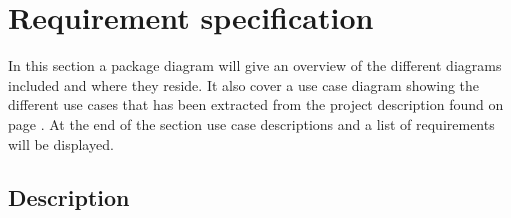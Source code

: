 \section{Requirement specification}
In this section a package diagram will give an overview of the different diagrams included and where they reside. It also cover a use case diagram showing the different use cases that has been extracted from the project description found on page \pageref{sc:problemdescription}. At the end of the section use case descriptions and a list of requirements will be displayed.
\subsection{Description}

\noindent{}





